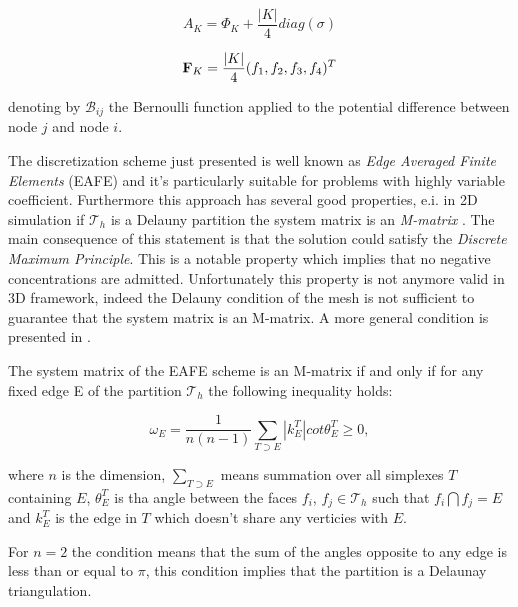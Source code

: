 \begin{equation}
\label{eq: matrice continuità}
A_K = \Phi_K + \dfrac{|K|}{4} diag (\sigma)
\end{equation}

\begin{equation}
\mathbf{F}_K = \dfrac{|K|}{4} (f_1,f_2,f_3,f_4)^T
\end{equation}

denoting by  $\mathcal{B}_{ij}$ the Bernoulli function applied to the potential difference between node $j$ and node $i$.

The discretization scheme just presented is well known as \textit{Edge Averaged Finite Elements} (EAFE) and it's particularly suitable for problems with  highly variable coefficient. Furthermore this approach has several good properties, e.i. in 2D simulation if $\mathcal{T}_h$ is a Delauny partition the system matrix is an \textit{M-matrix} \cite{BankMmatrixEAFE}. The main consequence of this statement is that the solution could satisfy the \textit{Discrete Maximum Principle}. This is a notable property which implies that no negative concentrations are admitted. Unfortunately this property is not anymore valid in 3D framework, indeed the Delauny condition of the mesh is not sufficient to guarantee that the system matrix is an M-matrix. A more general condition is presented in \cite{ZikatanovXu}.

\begin{Teorema}
The system matrix of the EAFE scheme is an M-matrix if and only if for any fixed edge E of the partition $\mathcal{T}_h$ the following inequality holds:

\begin{equation}
\label{eq: mesh delaunay condition}
\omega_E = \dfrac{1}{n(n-1)} \sum_{T\supset E} |k_E^T|cot\theta_E^T \geq 0,
\end{equation}

where $n$ is the dimension, $\sum_{T \supset E}$ means summation over all simplexes $T$ containing $E$, $\theta_E^T$ is tha angle between the faces $f_i$, $f_j \in \mathcal{T}_h$ such that $f_i \bigcap f_j = E$  and $k_E^T$ is the edge in $T$ which doesn't share any verticies with $E$.
\end{Teorema}

\begin{Osservazione}
For $n=2$ the condition  means that the sum of the angles opposite to any edge is less than or equal to $\pi$, this condition implies that the partition is a Delaunay triangulation.
\end{Osservazione}

